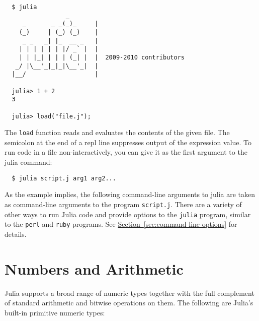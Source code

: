 \documentclass{article}
\renewcommand{\sec}[1]{\label{sec:#1}}
\newcommand{\Section}[1]{\hyperref[sec:#1]{Section~\ref*{sec:#1}}}
\begin{document}
\begin{verbatim}
  $ julia
                 _      
     _       _ _(_)_     |
    (_)     | (_) (_)    |  
     _ _   _| |_  __ _   |
    | | | | | | |/ _` |  |
    | | |_| | | | (_| |  |  2009-2010 contributors
   _/ |\__'_|_|_|\__'_|  |  
  |__/                   |

  julia> 1 + 2
  3

  julia> load("file.j");
\end{verbatim}
The \verb|load| function reads and evaluates the contents of the given file.
The semicolon at the end of a repl line suppresses output of the expression value.
To run code in a file non-interactively, you can give it as the first argument to the julia command:
\begin{verbatim}
  $ julia script.j arg1 arg2...
\end{verbatim}
As the example implies, the following command-line arguments to julia are taken as command-line arguments to the program \verb|script.j|.
There are a variety of other ways to run Julia code and provide options to the \verb|julia| program, similar to the \verb|perl| and \verb|ruby| programs.
See \Section{command-line-options} for details.

\section{Numbers and Arithmetic}\sec{numbers-and-arithmetic}

Julia supports a broad range of numeric types together with the full complement of standard arithmetic and bitwise operations on them.
The following are Julia's built-in primitive numeric types:
\end{document}
